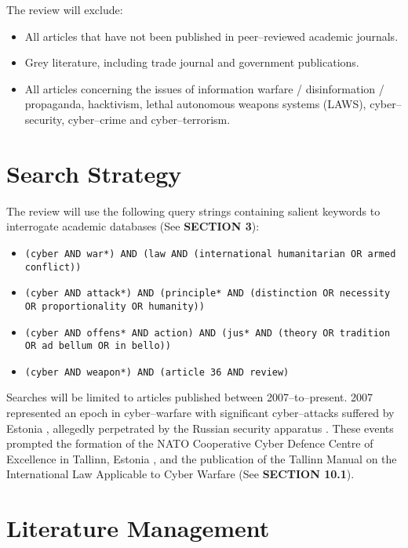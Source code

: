 \documentclass[british]{article}
\begin{document}
The review will exclude:
\begin{itemize}
\item All articles that have not been published in peer--reviewed academic
journals. 
\item Grey literature, including trade journal and government publications.
\item All articles concerning the issues of information warfare \slash{}
disinformation \slash{} propaganda, hacktivism, lethal autonomous weapons
systems (LAWS), cyber--security, cyber--crime and cyber--terrorism.
\end{itemize}

\section{Search Strategy}

The review will use the following query strings containing salient
keywords to interrogate academic databases (See \textbf{SECTION 3}): 
\begin{itemize}
\item \texttt{(cyber AND war{*}) AND (law AND (\textquotedbl international
humanitarian\textquotedbl{} OR \textquotedbl armed conflict\textquotedbl )) }
\item \texttt{(cyber AND attack{*}) AND (principle{*} AND (distinction OR
necessity OR proportionality OR humanity)) }
\item \texttt{(cyber AND offens{*} AND action) AND (jus{*} AND (theory OR
tradition OR \textquotedbl ad bellum\textquotedbl{} OR \textquotedbl in
bello\textquotedbl )) }
\item \texttt{(cyber AND weapon{*}) AND (\textquotedbl article 36\textquotedbl{}
AND review)}
\end{itemize}
Searches will be limited to articles published between 2007--to--present.
2007 represented an epoch in cyber--warfare with significant cyber--attacks
suffered by Estonia \cite{haataja20172007}, allegedly perpetrated
by the Russian security apparatus \cite{haataja20172007}. These events
prompted the formation of the NATO Cooperative Cyber Defence Centre
of Excellence in Tallinn, Estonia \cite{burton2015nato}, and the
publication of the Tallinn Manual on the International Law Applicable
to Cyber Warfare \cite{schmitt2013tallinn} (See \textbf{SECTION 10.1}). 

\section{Literature Management}
\end{document}
